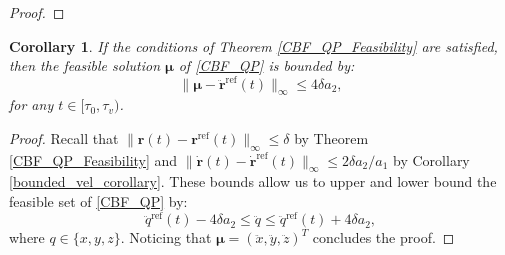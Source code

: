 \documentclass[journal,10pt]{IEEEtran}
\newtheorem{corollary}{\bfseries Corollary}%
\newcommand{\vect}[1]{\boldsymbol{\mathbf{#1}}}
\begin{document}
\begin{proof}
\end{proof}

\begin{corollary} \label{cbf_qp_feas_set_bound_cor}
If the conditions of Theorem \ref{CBF_QP_Feasibility} are satisfied, then the feasible solution $\vect{\mu}$ of \eqref{CBF_QP} is bounded by:
\begin{equation}\label{cbf_qp_feas_set_bound}
    \|\vect{\mu} - \ddot{\vect{r}}^{\text{ref}}(t)\|_{\infty}\leq 4\delta a_2,
\end{equation}
for any $t\in[\tau_0,\tau_v)$.
\end{corollary}
\begin{proof}
Recall that $\|\vect{r}(t)-\vect{r}^{\text{ref}}(t)\|_{\infty}\leq \delta$ by Theorem \ref{CBF_QP_Feasibility} and $\|\dot{\vect{r}}(t) -\dot{\vect{r}}^{\text{ref}}(t)\|_{\infty} \leq 2\delta a_2/a_1$ by Corollary \ref{bounded_vel_corollary}.
These bounds allow us to upper and lower bound the feasible set of \eqref{CBF_QP} by:
\begin{equation*}
    \ddot{q}^{\text{ref}}(t) - 4 \delta a_2\leq \ddot{q}\leq \ddot{q}^{\text{ref}}(t)+4\delta a_2,
\end{equation*}
where $q\in\{x,y,z\}$. Noticing that $\vect{\mu} = (\ddot{x},\ddot{y},\ddot{z})^T$ concludes the proof.
\end{proof}
\end{document}
